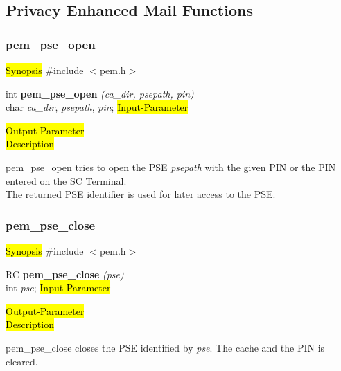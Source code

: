 \subsection{Privacy Enhanced Mail Functions}

\subsubsection{pem\_pse\_open}
\label{pem_pse_open}
\hl{Synopsis}
\#include $<$pem.h$>$ 

int {\bf pem\_pse\_open} {\em (ca\_dir, psepath, pin)} \\
char {\em *ca\_dir}, {\em *psepath}, {\em *pin};
\hl{Input-Parameter}


\hl{Output-Parameter}
 \\
\hl{Description}

pem\_pse\_open tries to open the PSE {\em *psepath} with the given PIN or
the PIN entered on the SC Terminal.
\\
The returned PSE identifier is used for later access to the PSE.




\subsubsection{pem\_pse\_close}
\label{pem_pse_close}
\hl{Synopsis}
\#include $<$pem.h$>$ 

RC {\bf pem\_pse\_close} {\em (pse)} \\
int {\em pse};
\hl{Input-Parameter}

\hl{Output-Parameter}
 \\
\hl{Description}

pem\_pse\_close closes the PSE identified by {\em pse}. The cache and the 
PIN is cleared.










